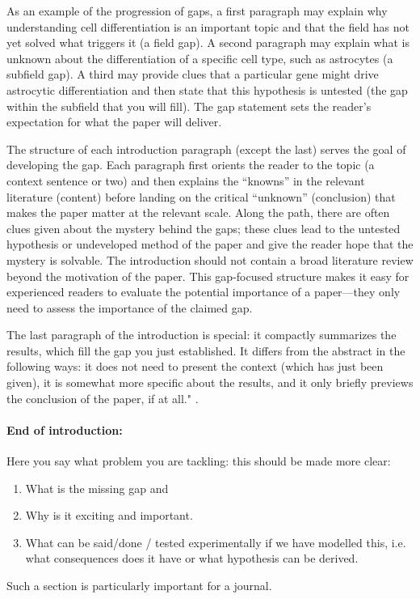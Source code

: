 As an example of the progression of gaps, a first paragraph may explain why understanding cell differentiation is an important topic and that the field has not yet solved what triggers it (a field gap). A second paragraph may explain what is unknown about the differentiation of a specific cell type, such as astrocytes (a subfield gap). A third may provide clues that a particular gene might drive astrocytic differentiation and then state that this hypothesis is untested (the gap within the subfield that you will fill). The gap statement sets the reader’s expectation for what the paper will deliver.

The structure of each introduction paragraph (except the last) serves the goal of developing the gap. Each paragraph first orients the reader to the topic (a context sentence or two) and then explains the “knowns” in the relevant literature (content) before landing on the critical “unknown” (conclusion) that makes the paper matter at the relevant scale. Along the path, there are often clues given about the mystery behind the gaps; these clues lead to the untested hypothesis or undeveloped method of the paper and give the reader hope that the mystery is solvable. The introduction should not contain a broad literature review beyond the motivation of the paper. This gap-focused structure makes it easy for experienced readers to evaluate the potential importance of a paper—they only need to assess the importance of the claimed gap.

The last paragraph of the introduction is special: it compactly summarizes the results, which fill the gap you just established. It differs from the abstract in the following ways: it does not need to present the context (which has just been given), it is somewhat more specific about the results, and it only briefly previews the conclusion of the paper, if at all." \cite{mensh2017ten}.



\paragraph{ End of introduction:}

 
 Here you say what problem you are tackling: this should be made more clear: 
 \begin{enumerate}
    \item What is the missing gap and 
    \item Why is it exciting and important.
    \item What can be said/done / tested experimentally if we have modelled this, i.e. what consequences does it have or what hypothesis can be derived.  
 \end{enumerate}
Such a section is particularly important for a journal.  
